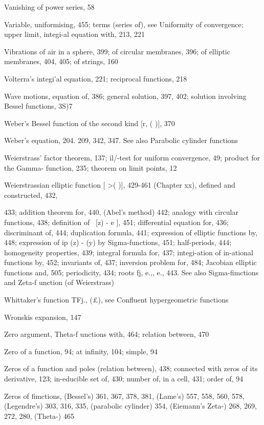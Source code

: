 Vanishing of power series, 58

Variable, uniformising, 455; terms (series of), see Uniformity of convergence; upper limit,
integi-al equation with, 213, 221

Vibrations of air in a sphere, 399; of circular membranes, 396; of elliptic membranes, 404, 405;
of strings, 160

Volterra's integi'al equation, 221; reciprocal functions, 218

Wave motions, equation of, 386; general solution, 397, 402; solution involving Bessel functions,
3S)7

Weber's Bessel function of the second kind [r, ( )], 370

Weber's equation, 204. 209, 342, 347. See also Parabolic cylinder functions

Weierstrass' factor theorem, 137; il/-test for uniform convergence, 49; product for the Gamma-
function, 235; theorem on limit points, 12

Weierstrassian elliptic function [  >( )], 429-461 (Chapter xx), defined and constructed, 432,

433; addition theorem for, 440, (Abel's method) 442; analogy with circular functions,
438; definition of \   [z) - e ], 451; differential equation for, 436; discriminant of, 444;
duplication formula, 441; expression of elliptic functions by, 448; expression of ip (z) -   (y)
by Sigma-functions, 451; half-periods, 444; homogeneity properties, 439; integral formula
for, 437; integi-ation of in-ational functions by, 452; invariants of, 437; inversion problem
for, 484; Jacobian elliptic functions and, 505; periodicity, 434; roots fj, e.,, e., 443. See
also Sigma-fimctions and Zeta-f unction (of Weierstrass)

Whittaker's function TFj., (£), see Confluent hypergeometric functions

Wronskis expansion, 147

Zero argument, Theta-f unctions with, 464; relation between, 470

Zero of a function, 94; at infinity, 104; simple, 94

Zeros of a function and poles (relation between), 438; connected with zeros of its derivative,
123; in-educible set of, 430; number of, in a cell, 431; order of, 94

Zeros of fimctions, (Bessel's) 361, 367, 378, 381, (Lame's) 557, 558, 560, 578, (Legendre's) 303,
316, 335, (parabolic cylinder) 354, (Eiemann's Zeta-) 268, 269, 272, 280, (Theta-) 465

